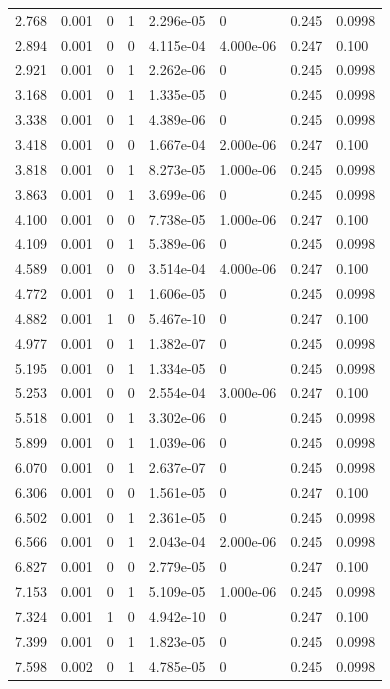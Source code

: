 \documentclass[preview]{standalone}
\begin{document}
{{\begin{tabular}{L{1.2cm}C{1.2cm} C{0.3cm}C{0.5cm} C{1.4cm}C{1.4cm} C{1.4cm}C{1.4cm}}
  2.768  &  0.001  & 0     &  1 &  2.296e-05  & 0  & 0.245 &  0.0998   \\ 
  2.894  &  0.001  & 0     &  0 &  4.115e-04  & 4.000e-06  & 0.247 &  0.100   \\ 
  2.921  &  0.001  & 0     &  1 &  2.262e-06  & 0  & 0.245 &  0.0998   \\ 
  3.168  &  0.001  & 0     &  1 &  1.335e-05  & 0  & 0.245 &  0.0998   \\ 
  3.338  &  0.001  & 0     &  1 &  4.389e-06  & 0  & 0.245 &  0.0998   \\ 
  3.418  &  0.001  & 0     &  0 &  1.667e-04  & 2.000e-06  & 0.247 &  0.100   \\ 
  3.818  &  0.001  & 0     &  1 &  8.273e-05  & 1.000e-06  & 0.245 &  0.0998   \\ 
  3.863  &  0.001  & 0     &  1 &  3.699e-06  & 0  & 0.245 &  0.0998   \\ 
  4.100  &  0.001  & 0     &  0 &  7.738e-05  & 1.000e-06  & 0.247 &  0.100   \\ 
  4.109  &  0.001  & 0     &  1 &  5.389e-06  & 0  & 0.245 &  0.0998   \\ 
  4.589  &  0.001  & 0     &  0 &  3.514e-04  & 4.000e-06  & 0.247 &  0.100   \\ 
  4.772  &  0.001  & 0     &  1 &  1.606e-05  & 0  & 0.245 &  0.0998   \\ 
  4.882  &  0.001  & 1     &  0 &  5.467e-10  & 0  & 0.247 &  0.100   \\ 
  4.977  &  0.001  & 0     &  1 &  1.382e-07  & 0  & 0.245 &  0.0998   \\ 
  5.195  &  0.001  & 0     &  1 &  1.334e-05  & 0  & 0.245 &  0.0998   \\ 
  5.253  &  0.001  & 0     &  0 &  2.554e-04  & 3.000e-06  & 0.247 &  0.100   \\ 
  5.518  &  0.001  & 0     &  1 &  3.302e-06  & 0  & 0.245 &  0.0998   \\ 
  5.899  &  0.001  & 0     &  1 &  1.039e-06  & 0  & 0.245 &  0.0998   \\ 
  6.070  &  0.001  & 0     &  1 &  2.637e-07  & 0  & 0.245 &  0.0998   \\ 
  6.306  &  0.001  & 0     &  0 &  1.561e-05  & 0  & 0.247 &  0.100   \\ 
  6.502  &  0.001  & 0     &  1 &  2.361e-05  & 0  & 0.245 &  0.0998   \\ 
  6.566  &  0.001  & 0     &  1 &  2.043e-04  & 2.000e-06  & 0.245 &  0.0998   \\ 
  6.827  &  0.001  & 0     &  0 &  2.779e-05  & 0  & 0.247 &  0.100   \\ 
  7.153  &  0.001  & 0     &  1 &  5.109e-05  & 1.000e-06  & 0.245 &  0.0998   \\ 
  7.324  &  0.001  & 1     &  0 &  4.942e-10  & 0  & 0.247 &  0.100   \\ 
  7.399  &  0.001  & 0     &  1 &  1.823e-05  & 0  & 0.245 &  0.0998   \\ 
  7.598  &  0.002  & 0     &  1 &  4.785e-05  & 0  & 0.245 &  0.0998   \\ 
\hline 
\end{tabular} 

}}
\end{document}
